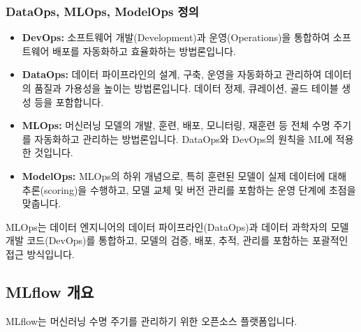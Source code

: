 \documentclass[11pt,a4paper]{article}
\begin{document}
\subsubsection*{DataOps, MLOps, ModelOps 정의}
\begin{itemize}
    \item \textbf{DevOps:} 소프트웨어 개발(Development)과 운영(Operations)을 통합하여 소프트웨어 배포를 자동화하고 효율화하는 방법론입니다.
    \item \textbf{DataOps:} 데이터 파이프라인의 설계, 구축, 운영을 자동화하고 관리하여 데이터의 품질과 가용성을 높이는 방법론입니다. 데이터 정제, 큐레이션, 골드 테이블 생성 등을 포함합니다.
    \item \textbf{MLOps:} 머신러닝 모델의 개발, 훈련, 배포, 모니터링, 재훈련 등 전체 수명 주기를 자동화하고 관리하는 방법론입니다. DataOps와 DevOps의 원칙을 ML에 적용한 것입니다.
    \item \textbf{ModelOps:} MLOps의 하위 개념으로, 특히 훈련된 모델이 실제 데이터에 대해 추론(scoring)을 수행하고, 모델 교체 및 버전 관리를 포함하는 운영 단계에 초점을 맞춥니다.
\end{itemize}
MLOps는 데이터 엔지니어의 데이터 파이프라인(DataOps)과 데이터 과학자의 모델 개발 코드(DevOps)를 통합하고, 모델의 검증, 배포, 추적, 관리를 포함하는 포괄적인 접근 방식입니다.

\subsection*{MLflow 개요}
MLflow는 머신러닝 수명 주기를 관리하기 위한 오픈소스 플랫폼입니다.
\end{document}
